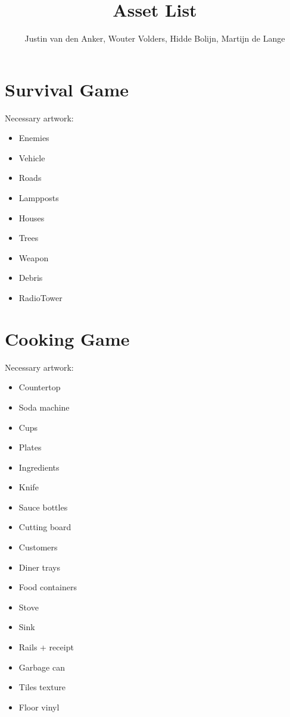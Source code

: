 \documentclass[10pt,a4paper]{article}
\author{Justin van den Anker, Wouter Volders, Hidde Bolijn, Martijn de Lange}
\title{Asset List}
\begin{document}
\maketitle

\section{Survival Game}
Necessary artwork:

\begin{itemize}
\item Enemies
\item Vehicle
\item Roads
\item Lampposts
\item Houses
\item Trees
\item Weapon
\item Debris
\item RadioTower
\end{itemize}

\newpage

\section{Cooking Game}
Necessary artwork:
\begin{itemize}
\item Countertop
\item Soda machine
\item Cups
\item Plates
\item Ingredients
\item Knife
\item Sauce bottles
\item Cutting board
\item Customers
\item Diner trays
\item Food containers
\item Stove
\item Sink
\item Rails + receipt
\item Garbage can
\item Tiles texture
\item Floor vinyl
\end{itemize}
\end{document}
